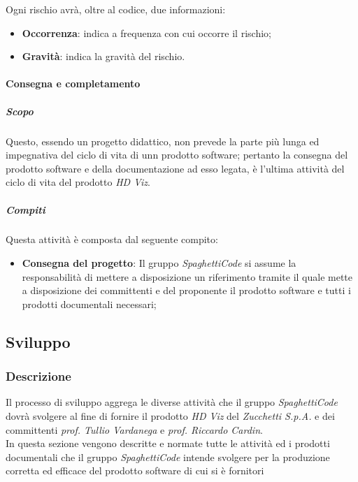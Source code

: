 Ogni rischio avrà, oltre al codice, due informazioni:
\begin{itemize}
	\item \textbf{Occorrenza}: indica a frequenza con cui occorre il rischio;
	\item \textbf{Gravità}: indica la gravità del rischio.
\end{itemize}

\paragraph{Consegna e completamento}
\label{par:consegna_e_completamento}
\subparagraph{Scopo}
\label{par:consegna_e_completamento:scopo}
Questo, essendo un progetto didattico, non prevede la parte più lunga ed impegnativa del ciclo di vita di unn prodotto software; pertanto la consegna del prodotto software e della documentazione ad esso legata, è l'ultima attività del ciclo di vita del prodotto \emph{HD Viz}.\\
\subparagraph{Compiti}
\label{par:consegna_e_completamento:compiti}
Questa attività è composta dal seguente compito:
\begin{itemize}
	\item \textbf{Consegna del progetto}: Il gruppo \emph{SpaghettiCode} si assume la responsabilità di mettere a disposizione un riferimento tramite il quale mette a disposizione dei committenti e del proponente il prodotto software e tutti i prodotti documentali necessari;
\end{itemize}


\subsection{Sviluppo}
\label{sub:sviluppo}

\subsubsection{Descrizione}
\label{ssub:sviluppo:descrizione}
Il processo di sviluppo aggrega le diverse attività che il gruppo \emph{SpaghettiCode} dovrà svolgere al fine di fornire il prodotto \emph{HD Viz} del  \emph{Zucchetti S.p.A.} e dei committenti \emph{prof. Tullio Vardanega} e \emph{prof. Riccardo Cardin}.\\

In questa sezione vengono descritte e normate tutte le attività ed i prodotti documentali che il gruppo \emph{SpaghettiCode} intende svolgere per la produzione corretta ed efficace del prodotto software di cui si è fornitori\\

